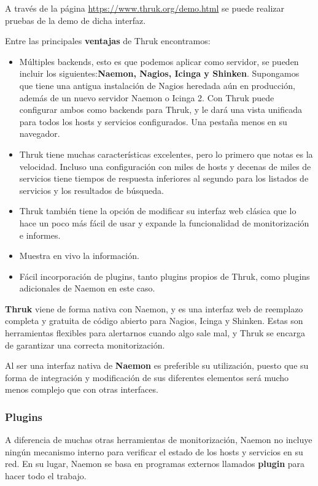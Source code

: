 A través de la página \url{https://www.thruk.org/demo.html} se puede realizar pruebas de la demo de dicha interfaz.

Entre las principales \textbf{ventajas}  de Thruk encontramos:
\begin{itemize}
	\item Múltiples backends, esto es que podemos aplicar como servidor, se pueden incluir los siguientes:\textbf{Naemon, Nagios, Icinga y Shinken}.
	Supongamos que tiene una antigua instalación de Nagios heredada aún en producción, además de un nuevo servidor Naemon o Icinga 2. Con Thruk puede configurar ambos como backends para Thruk, y le dará una vista unificada para todos los hosts y servicios configurados. Una pestaña menos en su navegador.
	\newpage
	\item Thruk tiene muchas características excelentes, pero lo primero que notas es la velocidad. Incluso una configuración con miles de hosts y decenas de miles de servicios tiene tiempos de respuesta inferiores al segundo para los listados de servicios y los resultados de búsqueda.
	\item Thruk también tiene la opción de modificar su interfaz web clásica que lo hace un poco más fácil de usar y expande la funcionalidad de monitorización e informes.
	\item Muestra en vivo la información.
	\item Fácil incorporación de plugins, tanto plugins propios de Thruk, como plugins adicionales de Naemon en este caso.	
\end{itemize}
\textbf{Thruk} viene de forma nativa con Naemon, y es una interfaz web de reemplazo completa y gratuita de código abierto para Nagios, Icinga y Shinken. Estas son herramientas flexibles para alertarnos cuando algo sale mal, y Thruk se encarga de garantizar una correcta monitorización.

Al ser una interfaz nativa de \textbf{Naemon} es preferible su utilización, puesto que su forma de integración y modificación de sus diferentes elementos será mucho menos complejo que con otras interfaces.

\subsubsection{Plugins}
A diferencia de muchas otras herramientas de monitorización, Naemon no incluye ningún mecanismo interno para verificar el estado de los hosts y servicios en su red. En su lugar, Naemon se basa en programas externos llamados \textbf{plugin} para hacer todo el trabajo.

